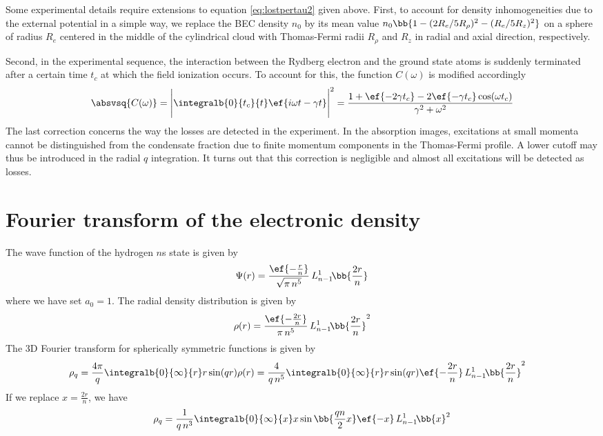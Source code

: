 Some experimental details require extensions to equation \eqref{eq:lostpertau2} given above.
First, to account for density inhomogeneities due to the external potential in a simple way, we replace the BEC density $n_0$ by its mean value $n_0 \bb{1-(2R_e/5R_\rho)^2 - (R_e/5R_z)^2}$ on a sphere of radius $R_e$ centered in the middle of the cylindrical cloud with Thomas-Fermi radii $R_\rho$ and $R_z$ in radial and axial direction, respectively.

Second, in the experimental sequence, the interaction between the Rydberg electron and the ground state atoms is suddenly terminated after a certain time $t_c$ at which the field ionization occurs. To account for this, the function $C(\omega)$ is modified accordingly
\begin{align}
\absvsq{C(\omega)}=\Bigg| \integralb{0}{t_c}{t}\ef{i\omega t-\gamma t} \Bigg|^2=\frac{1+\ef{-2\gamma t_c} -2 \ef{-\gamma t_c} \cos(\omega t_c)}{\gamma^2+\omega^2}
\end{align}
The last correction concerns the way the losses are detected in the experiment. In the absorption images, excitations at small momenta cannot be distinguished from the condensate fraction due to finite momentum components in the Thomas-Fermi profile. A lower cutoff may thus be introduced in the radial $q$ integration. It turns out that this correction is negligible and almost all excitations will be detected as losses.

\section{Fourier transform of the electronic density}
The wave function of the hydrogen $n$s state is given by
\begin{align}
\Psi(r)=\frac{\ef{-\frac{r}{n}}}{\sqrt{\pi\, n^5}} \, L_{n-1}^1\!\bb{\frac{2 r}{n}}
\end{align}
where we have set $a_0=1$. The radial density distribution is given by
\begin{align}
\rho(r)=\frac{\ef{-\frac{2r}{n}}}{\pi\, n^5} \, L_{n-1}^1\!\bb{\frac{2 r}{n}}^2
\end{align}
The 3D Fourier transform for spherically symmetric functions is given by
\begin{align}
\rho_q=\frac{4\pi}{q}\integralb{0}{\infty}{r} r \sin(qr) \rho(r)
&=\frac{4}{q\,n^5}\integralb{0}{\infty}{r} r \sin(qr) \ef{-\frac{2r}{n}} \, L_{n-1}^1\!\bb{\frac{2 r}{n}}^2
\end{align}
If we replace $x=\frac{2r}{n}$, we have
\begin{align}
\rho_q=\frac{1}{q\,n^3}\integralb{0}{\infty}{x} x \sin\bb{\frac{qn}{2}x} \ef{-x} \, L_{n-1}^1\!\bb{x}^2
\end{align}
